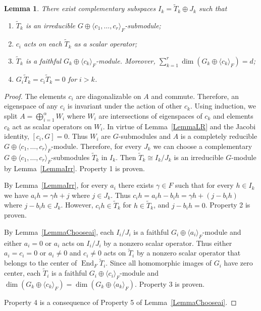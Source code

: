 \documentclass[12pt, reqno, a4paper]{amsart}
\theoremstyle{plain}
\newtheorem{lemma}{Lemma}
\theoremstyle{remark}
\theoremstyle{definition}
\begin{document}
\begin{lemma}\label{LemmaciProperties}
There exist complementary subspaces $I_k=
\tilde T_k \oplus J_k$ such that
\begin{enumerate}
\item $\tilde T_k$ is an irreducible $G\oplus \langle c_1, \ldots, c_r \rangle_F$-submodule;
\item $c_i$ acts on each $\tilde T_k$ as a scalar operator;
\item $\tilde T_k$ is a faithful $G_k\oplus \langle c_k \rangle_F$-module. Moreover,
$\sum\limits_{k=1}^r\dim (G_k\oplus \langle c_k \rangle_F) = d$;
\item $G_i \tilde T_k = c_i \tilde T_k = 0$ for $i > k$.
\end{enumerate}
\end{lemma}
\begin{proof}
The elements $c_i$ are diagonalizable on $A$ and commute. Therefore, an eigenspace
of any $c_i$ is invariant under the action of other $c_k$.
Using induction, we split $A = \bigoplus_{i=1}^\alpha W_i$
where $W_i$ are intersections of eigenspaces of $c_k$
and elements $c_k$ act as scalar operators on $W_i$.
In virtue of Lemma~\ref{LemmaLR} and the Jacobi identity,
 $[c_i, G]=0$. Thus $W_i$ are $G$-submodules
 and $A$ is a completely reducible
 $G\oplus \langle c_1, \ldots, c_r \rangle_F$-module.
  Therefore, for every $J_k$ we can choose
  a complementary  $G\oplus \langle c_1, \ldots, c_r \rangle_F$-submodules
  $\tilde T_k$ in $I_k$.
Then $\tilde T_k \cong I_k/J_k$  is an irreducible $G$-module
by Lemma~\ref{LemmaIrr}. Property 1 is proven.

By Lemma~\ref{LemmaIrr}, for every $a_i$ there exists
$\gamma \in F$ such that for every $h \in I_k$
we have $a_i h = \gamma h + j$ where
$j \in J_k$.
Thus $c_i h  = a_i h - b_i h = \gamma h + (j-b_i h)$
where $j - b_i h \in J_k$. However, $c_i h \in \tilde T_k$
for $ h \in \tilde T_k$,
and $j-b_i h = 0$. Property 2 is proven.

By Lemma~\ref{LemmaChooseai}, each $I_i/J_i$ is a faithful $G_i\oplus\langle a_i\rangle_F$-module
and either $a_i=0$ or $a_i$ acts on $I_i/J_i$ by a nonzero scalar operator.
Thus  either $a_i=c_i=0$ or $a_i \ne 0$ and $c_i \ne 0$ acts on $\tilde T_i$ by a nonzero scalar operator
that belongs to the center of $\operatorname{End}_F \tilde  T_i$.
Since all homomorphic images of $G_i$ have zero center,
each $\tilde T_i$ is a faithful $G_i\oplus\langle c_i\rangle_F$-module
and $\dim (G_k\oplus \langle c_k \rangle_F) = \dim (G_k\oplus \langle a_k \rangle_F)$.
Property 3 is proven.

Property 4 is a consequence of Property
5 of Lemma~\ref{LemmaChooseai}.
\end{proof}
\end{document}
